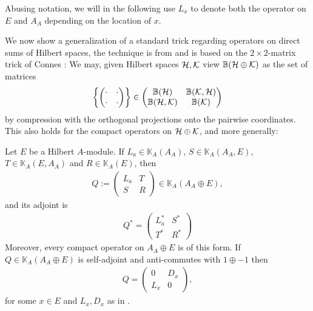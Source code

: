 \begin{note}
	Abusing notation, we will in the following use $L_x$ to denote both the operator on $E$ and $A_A$ depending on the location of $x$.
\end{note}
 We now show a generalization of a standard trick regarding operators on direct sums of Hilbert spaces, the technique is from \cite{blanchard1996deformations} and is based on the $2\times 2$-matrix trick of Connes \cite{connesclassification}: We may, given Hilbert spaces $\mathcal{H}, \mathcal{K}$ view $\mathbb{B}(\mathcal{H} \oplus \mathcal{K})$ as the set of matrices
\begin{align*}
	\left\{ \begin{pmatrix}
	\cdot & \cdot \\
	\cdot & \cdot
\end{pmatrix}\right\} \in	\begin{pmatrix}
		\mathbb{B}(\mathcal{H}) & \mathbb{B}(\mathcal{K},\mathcal{H})\\
		\mathbb{B}(\mathcal{H},\mathcal{K}) &   \mathbb{B}(\mathcal{K})
	\end{pmatrix}
\end{align*}
by compression with the orthogonal projections onto the pairwise coordinates. This also holds for the compact operators on $\mathcal{H} \oplus \mathcal{K}$, and more generally:
\begin{lemma}
	Let $E$ be a Hilbert $A$-module. If $L_a \in \mathbb{K}_A(A_A)$, $S \in \mathbb{K}_A(A_A,E)$, $T \in \mathbb{K}_A(E,A_A)$ and $R \in \mathbb{K}_A(E)$, then
	\begin{align*}
		Q := \begin{pmatrix}
			L_a & T \\
			S & R
		\end{pmatrix}\in \mathbb{K}_A(A_A \oplus E),
	\end{align*}
	and its adjoint is
	\begin{align*}
		Q^* = \begin{pmatrix}
			L_a^* & S^* \\
			T^* & R^*
		\end{pmatrix}
	\end{align*}
	Moreover, every compact operator on $A_A \oplus E$ is of this form. If $Q \in \mathbb{K}_A(A_A \oplus E)$ is self-adjoint and anti-commutes with $1 \oplus -1$ then
	\begin{align*}
		Q = \begin{pmatrix}
			0 & D_x \\
			L_x  & 0
		\end{pmatrix},
	\end{align*}
	for some $x \in E$ and $L_x, D_x$ as in .
	\label{mult:2x2trick}
\end{lemma}

